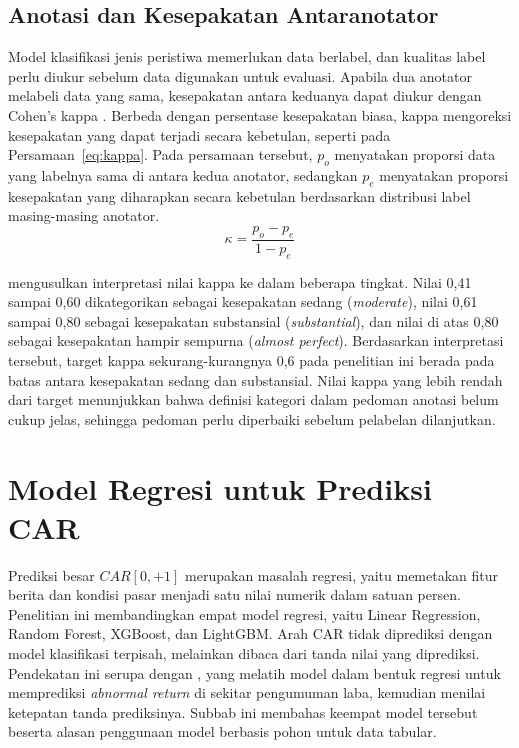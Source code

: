 \subsection{Anotasi dan Kesepakatan Antaranotator}

Model klasifikasi jenis peristiwa memerlukan data berlabel, dan kualitas label perlu diukur sebelum data digunakan untuk evaluasi. Apabila dua anotator melabeli data yang sama, kesepakatan antara keduanya dapat diukur dengan Cohen's kappa \autocite{cohen1960}. Berbeda dengan persentase kesepakatan biasa, kappa mengoreksi kesepakatan yang dapat terjadi secara kebetulan, seperti pada Persamaan~\ref{eq:kappa}. Pada persamaan tersebut, $p_o$ menyatakan proporsi data yang labelnya sama di antara kedua anotator, sedangkan $p_e$ menyatakan proporsi kesepakatan yang diharapkan secara kebetulan berdasarkan distribusi label masing-masing anotator.
\begin{equation}
\kappa = \frac{p_o - p_e}{1 - p_e}
\label{eq:kappa}
\end{equation}

\textcite{landis1977} mengusulkan interpretasi nilai kappa ke dalam beberapa tingkat. Nilai 0,41 sampai 0,60 dikategorikan sebagai kesepakatan sedang (\emph{moderate}), nilai 0,61 sampai 0,80 sebagai kesepakatan substansial (\emph{substantial}), dan nilai di atas 0,80 sebagai kesepakatan hampir sempurna (\emph{almost perfect}). Berdasarkan interpretasi tersebut, target kappa sekurang-kurangnya 0,6 pada penelitian ini berada pada batas antara kesepakatan sedang dan substansial. Nilai kappa yang lebih rendah dari target menunjukkan bahwa definisi kategori dalam pedoman anotasi belum cukup jelas, sehingga pedoman perlu diperbaiki sebelum pelabelan dilanjutkan.

\section{Model Regresi untuk Prediksi CAR}
\label{sec:model-regresi}

Prediksi besar $CAR[0,+1]$ merupakan masalah regresi, yaitu memetakan fitur berita dan kondisi pasar menjadi satu nilai numerik dalam satuan persen. Penelitian ini membandingkan empat model regresi, yaitu Linear Regression, Random Forest, XGBoost, dan LightGBM. Arah CAR tidak diprediksi dengan model klasifikasi terpisah, melainkan dibaca dari tanda nilai yang diprediksi. Pendekatan ini serupa dengan \textcite{amelzadeh2020}, yang melatih model dalam bentuk regresi untuk memprediksi \emph{abnormal return} di sekitar pengumuman laba, kemudian menilai ketepatan tanda prediksinya. Subbab ini membahas keempat model tersebut beserta alasan penggunaan model berbasis pohon untuk data tabular.

